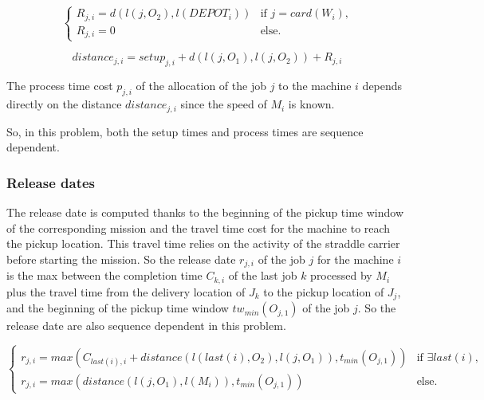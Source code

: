 \documentclass[a4paper,10pt]{article}
\begin{document}
\begin{equation*}
\begin{cases}
 R_{j, i} = d(l(j,O_2),l(DEPOT_{i})) & \text{if $j = card(W_{i})$,} \\
 R_{j, i} = 0 & \text{else.}
\end{cases}
\end{equation*}

\begin{equation*}
  distance_{j,i} = setup_{j, i} + d(l(j,O_1), l(j,O_2)) + R_{j,i}
\end{equation*}

The process time cost $p_{j, i}$ of the allocation of the job $j$ to the machine $i$ depends directly on the distance $distance_{j,i}$ since the speed of $M_i$ is known.

So, in this problem, both the setup times and process times are sequence dependent.


\subsubsection{Release dates}
The release date is computed thanks to the beginning of the pickup time window of the corresponding mission and the travel time cost for the machine to reach the pickup location. This travel time relies on the activity of the straddle carrier before starting the mission. So the release date $r_{j,i}$ of the job $j$ for the machine $i$ is the max between the completion time $C_{k,i}$ of the last job $k$  processed by $M_i$ plus the travel time from the delivery location of $J_k$ to the pickup location of $J_j$, and the beginning of the pickup time window $tw_{min}(O_{j,1})$ of the job $j$. So the release date are also sequence dependent in this problem.

\begin{equation*}
 \begin{cases}
    r_{j,i} = max(C_{last(i),i} + distance(l(last(i),O_2),l(j,O_1)) , t_{min}(O_{j,1})) & \text{if $\exists last(i)$,}\\
    r_{j,i} = max(distance(l(j,O_1) , l(M_i)) , t_{min}(O_{j,1})) & \text{else.}
\end{cases}
\end{equation*}
\end{document}
